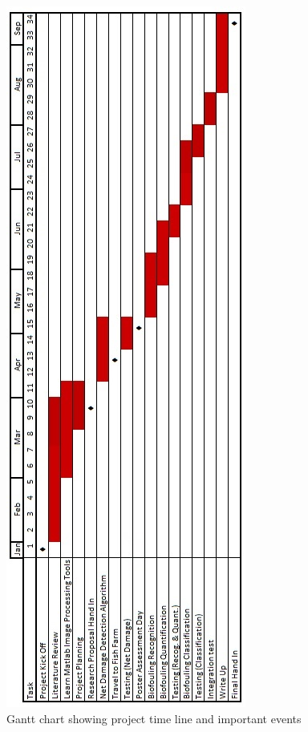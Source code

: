 \documentclass[11.5pt, twoside, a4paper]{article}
\begin{document}
\begin{figure}
\begin{center}
\includegraphics{Gantt.jpg}
\caption{Gantt chart showing project time line and important events \label{fig:gantt}}
\end{center}
\end{figure}


{}
\end{document}
